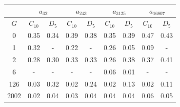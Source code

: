 \begin{table}[h]
   \begin{center}
        \begin{tabular}{c|c|c|c|c|c|c|c|c}
            \toprule
            & \multicolumn{2}{c|}{$a_{32}$} & \multicolumn{2}{c|}{$a_{243}$} & \multicolumn{2}{c|}{$a_{3125}$} & \multicolumn{2}{c}{$a_{16807}$} \\
            \midrule
            $G$ & $C_{10}$ & $D_{5}$ & $C_{10}$ & $D_{5}$ & $C_{10}$ & $D_{5}$ & $C_{10}$ & $D_{5}$ \\
            \midrule
            0 & 0.35 & 0.34 & 0.39 & 0.38 & 0.35 & 0.39 & 0.47 & 0.43 \\
            1 & 0.32 & - & 0.22 & - & 0.26 & 0.05 & 0.09 & - \\
            2 & 0.28 & 0.30 & 0.33 & 0.33 & 0.26 & 0.38 & 0.37 & 0.41 \\
            6 & - & - & - & - & 0.06 & 0.01 & - & - \\
            126 & 0.03 & 0.32 & 0.02 & 0.24 & 0.02 & 0.13 & 0.02 & 0.11 \\
            2002 & 0.02 & 0.04 & 0.03 & 0.04 & 0.04 & 0.04 & 0.06 & 0.05 \\
            \bottomrule
        \end{tabular}
   \end{center}
\end{table}
